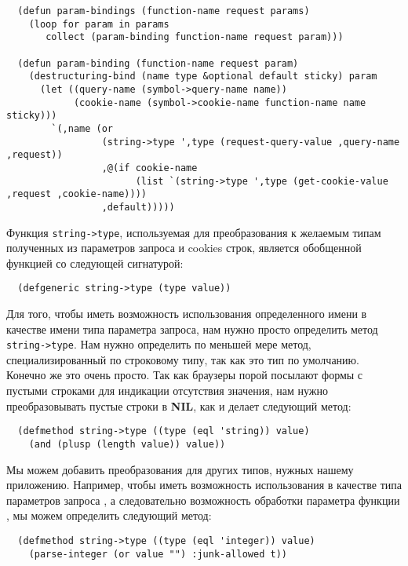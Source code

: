 \begin{lstlisting}
  (defun param-bindings (function-name request params)
    (loop for param in params
       collect (param-binding function-name request param)))

  (defun param-binding (function-name request param)
    (destructuring-bind (name type &optional default sticky) param
      (let ((query-name (symbol->query-name name))
            (cookie-name (symbol->cookie-name function-name name sticky)))
        `(,name (or 
                 (string->type ',type (request-query-value ,query-name ,request))
                 ,@(if cookie-name
                       (list `(string->type ',type (get-cookie-value ,request ,cookie-name))))
                 ,default)))))
\end{lstlisting}

Функция \lstinline!string->type!, используемая для преобразования к желаемым типам
полученных из параметров запроса и cookies строк, является обобщенной функцией со
следующей сигнатурой:

\begin{lstlisting}
  (defgeneric string->type (type value))
\end{lstlisting}

Для того, чтобы иметь возможность использования определенного имени в качестве имени типа
параметра запроса, нам нужно просто определить метод \lstinline!string->type!. Нам нужно
определить по меньшей мере метод, специализированный по строковому типу, так как это тип
по умолчанию. Конечно же это очень просто. Так как браузеры порой посылают формы с пустыми
строками для индикации отсутствия значения, нам нужно преобразовывать пустые строки в
\textbf{NIL}, как и делает следующий метод:

\begin{lstlisting}
  (defmethod string->type ((type (eql 'string)) value)
    (and (plusp (length value)) value))
\end{lstlisting}

Мы можем добавить преобразования для других типов, нужных нашему приложению. Например,
чтобы иметь возможность использования в качестве типа параметров запроса , а
следовательно возможность обработки параметра  функции , мы
можем определить следующий метод:

\begin{lstlisting}
  (defmethod string->type ((type (eql 'integer)) value)
    (parse-integer (or value "") :junk-allowed t))
\end{lstlisting}

